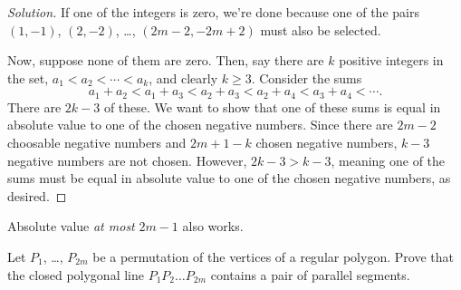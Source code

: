 \documentclass[11pt]{scrartcl}
\newenvironment{soln}{\begin{proof}[Solution]}{\end{proof}}
\begin{document}
\begin{soln}
	If one of the integers is zero, we're done
	because one of the pairs $(1, -1)$, $(2, -2)$, \dots, $(2m-2, -2m+2)$
	must also be selected.
	
	Now, suppose none of them are zero. Then, say there are $k$
	positive integers in the set, $a_1 < a_2 < \cdots < a_k$,
	and clearly $k\ge 3$.
	Consider the sums
	\[a_1 + a_2 < a_1 + a_3 < a_2 + a_3 < a_2 + a_4 < a_3 + a_4 < \cdots.\]
	There are $2k-3$ of these.
	We want to show that one of these sums is equal in absolute value
	to one of the chosen negative numbers.
	Since there are $2m - 2$ choosable negative numbers
	and $2m+1-k$ chosen negative numbers, $k-3$ negative numbers are not chosen.
	However, $2k - 3 > k - 3$, meaning one of the sums must be equal
	in absolute value to one of the chosen negative numbers, as desired.
\end{soln}

\begin{remark*}
	Absolute value \emph{at most} $2m-1$ also works.
\end{remark*}

\begin{problem}
	Let $P_1$, \dots, $P_{2m}$ be a permutation of the vertices of a
	regular polygon. Prove that the closed polygonal line $P_1P_2\dots P_{2m}$
	contains a pair of parallel segments.
\end{problem}
\end{document}
